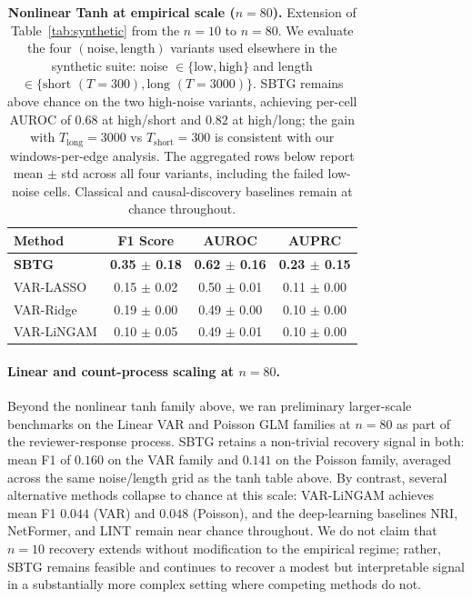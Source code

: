 \documentclass{article}
\theoremstyle{plain}
\theoremstyle{definition}
\theoremstyle{remark}
\newcommand{\1}{\mathbf{1}}
\begin{document}
\begin{table}[h!]
\centering
\caption{\textbf{Nonlinear Tanh at empirical scale ($n{=}80$).} Extension of Table~\ref{tab:synthetic} from the $n{=}10$ to $n{=}80$. We evaluate the four $(\text{noise}, \text{length})$ variants used elsewhere in the synthetic suite: noise $\in \{\text{low}, \text{high}\}$ and length $\in \{\text{short } (T{=}300), \text{long } (T{=}3000)\}$. SBTG remains above chance on the two high-noise variants, achieving per-cell AUROC of $0.68$ at high/short and $0.82$ at high/long; the gain with $T_{\text{long}}{=}3000$ vs $T_{\text{short}}{=}300$ is consistent with our windows-per-edge analysis.  The aggregated rows below report mean $\pm$ std across all four variants, including the failed low-noise cells. Classical and causal-discovery baselines remain at chance throughout.}
\label{tab:res_tanh_n80}
\begin{small}
\begin{tabular}{lccc}
\toprule
Method & F1 Score & AUROC & AUPRC \\
\midrule
\textbf{SBTG} & \textbf{0.35 $\pm$ 0.18} & \textbf{0.62 $\pm$ 0.16} & \textbf{0.23 $\pm$ 0.15} \\
VAR-LASSO & 0.15 $\pm$ 0.02 & 0.50 $\pm$ 0.01 & 0.11 $\pm$ 0.00 \\
VAR-Ridge & 0.19 $\pm$ 0.00 & 0.49 $\pm$ 0.00 & 0.10 $\pm$ 0.00 \\
VAR-LiNGAM & 0.10 $\pm$ 0.05 & 0.49 $\pm$ 0.01 & 0.10 $\pm$ 0.00 \\
\bottomrule
\end{tabular}
\end{small}
\end{table}

\paragraph{Linear and count-process scaling at $n{=}80$.}
\label{app:n80_scaling}
Beyond the nonlinear tanh family above, we ran preliminary larger-scale benchmarks on the Linear VAR and Poisson GLM families at $n{=}80$ as part of the reviewer-response process. SBTG retains a non-trivial recovery signal in both: mean F1 of $0.160$ on the VAR family and $0.141$ on the Poisson family, averaged across the same noise/length grid as the tanh table above. By contrast, several alternative methods collapse to chance at this scale: VAR-LiNGAM achieves mean F1 $0.044$ (VAR) and $0.048$ (Poisson), and the deep-learning baselines NRI, NetFormer, and LINT remain near chance throughout. We do not claim that $n{=}10$ recovery extends without modification to the empirical regime; rather, SBTG remains feasible and continues to recover a modest but interpretable signal in a substantially more complex setting where competing methods do not.
\end{document}
